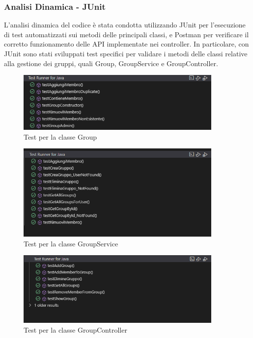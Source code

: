 \subsubsection{Analisi Dinamica - JUnit}

L'analisi dinamica del codice è stata condotta utilizzando JUnit per l'esecuzione di test automatizzati sui metodi delle principali classi, e Postman per verificare il corretto funzionamento delle API implementate nei controller.
In particolare, con JUnit sono stati sviluppati test specifici per validare i metodi delle classi relative alla gestione dei gruppi, quali Group, GroupService e GroupController.

\begin{figure}[H]
    \centering
    \includegraphics[width=0.9\textwidth]{images/TestGroup.png}
    \caption{Test per la classe Group}
    \label{fig:Group_test}
\end{figure}

\begin{figure}[H]
    \centering
    \includegraphics[width=0.9\textwidth]{images/TestGroupService.png}
    \caption{Test per la classe GroupService}
    \label{fig:GroupService_test}
\end{figure}

\begin{figure}[H]
    \centering
    \includegraphics[width=0.9\textwidth]{images/TestGroupController.png}
    \caption{Test per la classe GroupController}
    \label{fig:GroupController_test}
\end{figure}


